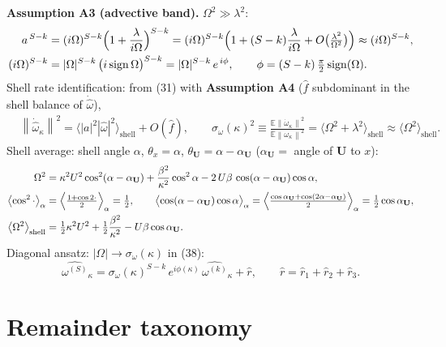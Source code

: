 \documentclass[11pt]{article}
\newcommand{\norm}[1]{\left\lVert #1 \right\rVert}
\newcommand{\E}{\mathbb{E}}
\begin{document}
\textbf{Assumption A3 (advective band).} $\Omega^{2}\gg\lambda^{2}$:
\begin{align}
a^{\,S-k}
&=(i\Omega)^{S-k}\Bigl(1+\frac{\lambda}{i\Omega}\Bigr)^{S-k}
=(i\Omega)^{S-k}\Bigl(1+(S-k)\frac{\lambda}{i\Omega}
+O\bigl(\tfrac{\lambda^2}{\Omega^2}\bigr)\Bigr)
\approx(i\Omega)^{S-k},\\
(i\Omega)^{S-k}
&=|\Omega|^{S-k}\,\bigl(i\,\mathrm{sign}\,\Omega\bigr)^{S-k}
=|\Omega|^{S-k}\,e^{\,i\phi},\qquad
\phi=(S-k)\,\tfrac{\pi}{2}\,\mathrm{sign}(\Omega).
\end{align}
Shell rate identification: from (31) with
\textbf{Assumption A4} ($\hat f$ subdominant in the shell balance of
$\dot{\hat\omega}$),
\begin{align}
&\norm{\dot{\hat\omega}_\kappa}^{2}
=\bigl\langle|a|^{2}|\hat\omega|^{2}\bigr\rangle_{\mathrm{shell}}
+O(\hat f),\qquad
\sigma_\omega(\kappa)^{2}
\equiv\frac{\E\norm{\dot\omega_\kappa}^{2}}{\E\norm{\omega_\kappa}^{2}}
=\bigl\langle\Omega^{2}+\lambda^{2}\bigr\rangle_{\mathrm{shell}}
\approx\bigl\langle\Omega^{2}\bigr\rangle_{\mathrm{shell}} .
\end{align}
Shell average: shell angle $\alpha$, $\theta_x=\alpha$,
$\theta_{\mathbf U}=\alpha-\alpha_{\mathbf U}$
($\alpha_{\mathbf U}=$ angle of $\mathbf U$ to $x$):
\begin{align}
\Omega^{2}
&=\kappa^{2}U^{2}\cos^{2}(\alpha-\alpha_{\mathbf U})
+\frac{\beta^{2}}{\kappa^{2}}\cos^{2}\alpha
-2\,U\beta\,\cos(\alpha-\alpha_{\mathbf U})\cos\alpha,\\
\bigl\langle\cos^{2}\cdot\bigr\rangle_\alpha
&=\Bigl\langle\tfrac{1+\cos2\cdot}{2}\Bigr\rangle_\alpha=\tfrac12,\qquad
\bigl\langle\cos(\alpha-\alpha_{\mathbf U})\cos\alpha\bigr\rangle_\alpha
=\Bigl\langle\tfrac{\cos\alpha_{\mathbf U}
+\cos(2\alpha-\alpha_{\mathbf U})}{2}\Bigr\rangle_\alpha
=\tfrac12\cos\alpha_{\mathbf U},\\
\bigl\langle\Omega^{2}\bigr\rangle_{\mathrm{shell}}
&=\tfrac{1}{2}\kappa^{2}U^{2}
+\tfrac{1}{2}\frac{\beta^{2}}{\kappa^{2}}
-U\beta\cos\alpha_{\mathbf{U}} .
\end{align}
Diagonal ansatz: $|\Omega|\to\sigma_\omega(\kappa)$ in (38):
\begin{equation}
\widehat{\omega^{(S)}}_\kappa
=\sigma_\omega(\kappa)^{S-k}\,e^{i\phi(\kappa)}\,
\widehat{\omega^{(k)}}_\kappa+\hat r,\qquad
\hat r=\hat r_1+\hat r_2+\hat r_3 .
\end{equation}

\section{Remainder taxonomy}
\end{document}
